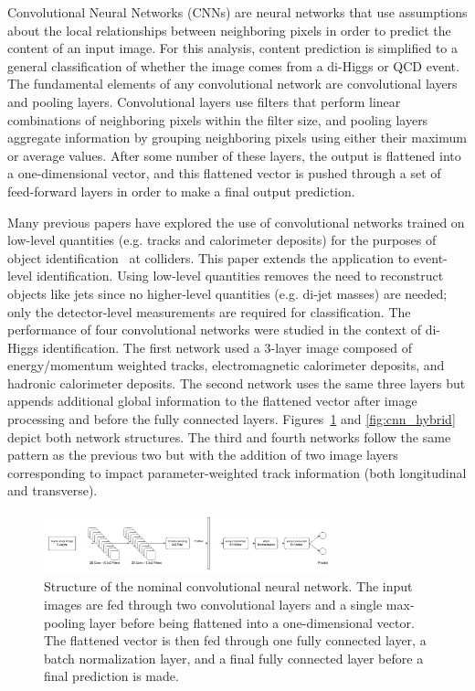 \label{sec:CNN}
Convolutional Neural Networks (CNNs) are neural networks that use assumptions about the local relationships between neighboring pixels in order to predict the content of an input image. For this analysis, content prediction is simplified to a general classification of whether the image comes from a di-Higgs or QCD event. The fundamental elements of any convolutional network are convolutional layers and pooling layers. Convolutional layers use filters that perform linear combinations of neighboring pixels within the filter size, and pooling layers aggregate information by grouping neighboring pixels using either their maximum or average values. After some number of these layers, the output is flattened into a one-dimensional vector, and this flattened vector is pushed through a set of feed-forward layers in order to make a final output prediction. 

Many previous papers have explored the use of convolutional networks trained on low-level quantities (e.g. tracks and calorimeter deposits) for the purposes of object identification~\cite{Alison:2019kud} at colliders. This paper extends the application to event-level identification. Using low-level quantities removes the need to reconstruct objects like jets since no higher-level quantities (e.g. di-jet masses) are needed; only the detector-level measurements are required for classification. The performance of four convolutional networks were studied in the context of di-Higgs identification. The first network used a 3-layer image composed of energy/momentum weighted tracks, electromagnetic calorimeter deposits, and hadronic calorimeter deposits. The second network uses the same three layers but appends additional global information to the flattened vector after image processing and before the fully connected layers. Figures~\ref{fig:cnn_nominal} and \ref{fig:cnn_hybrid} depict both network structures. The third and fourth networks follow the same pattern as the previous two but with the addition of two image layers corresponding to impact parameter-weighted track information (both longitudinal and transverse).

\begin{figure}[!h] 
\begin{center}
\includegraphics*[width=0.75\textwidth] {CNN/figures/nominalCNN.png}
\caption{Structure of the nominal convolutional neural network. The input images are fed through two convolutional layers and a single max-pooling layer before being flattened into a one-dimensional vector. The flattened vector is then fed through one fully connected layer, a batch normalization layer, and a final fully connected layer before a final prediction is made.}
  \label{fig:cnn_nominal}
\end{center}
\end{figure}

